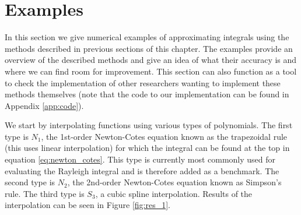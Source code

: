 \section{Examples}
\label{examples}
In this section we give numerical examples of approximating integrals using the methods described in previous sections of this chapter.
The examples provide an overview of the described methods and give an idea of what their accuracy is and where we can find room for improvement.
This section can also function as a tool to check the implementation of other researchers wanting to implement these methods themselves (note that the code to our implementation can be found in Appendix \ref{app:code}).

We start by interpolating functions using various types of polynomials.
The first type is $N_1$, the 1st-order Newton-Cotes equation known as the trapezoidal rule (this uses linear interpolation) for which the integral can be found at the top in equation \ref{eq:newton_cotes}.
This type is currently most commonly used for evaluating the Rayleigh integral and is therefore added as a benchmark.
The second type is $N_2$, the 2nd-order Newton-Cotes equation known as Simpson's rule.
The third type is $S_3$, a cubic spline interpolation.
Results of the interpolation can be seen in Figure \ref{fig:res_1}.
